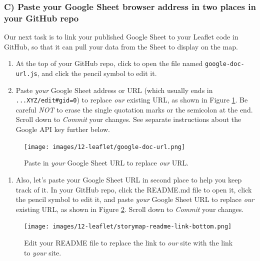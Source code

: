 \documentclass[
  english,
]{book}
\providecommand{\tightlist}{%
  \setlength{\itemsep}{0pt}\setlength{\parskip}{0pt}}
\begin{document}
\hypertarget{c-paste-your-google-sheet-browser-address-in-two-places-in-your-github-repo-1}{%
\subsubsection*{C) Paste your Google Sheet browser address in two places in your GitHub repo}\label{c-paste-your-google-sheet-browser-address-in-two-places-in-your-github-repo-1}}

Our next task is to link your published Google Sheet to your Leaflet code in GitHub, so that it can pull your data from the Sheet to display on the map.

\begin{enumerate}
\def\labelenumi{\arabic{enumi}.}
\item
  At the top of your GitHub repo, click to open the file named \texttt{google-doc-url.js}, and click the pencil symbol to edit it.
\item
  Paste \emph{your} Google Sheet address or URL (which usually ends in \texttt{...XYZ/edit\#gid=0}) to replace \emph{our} existing URL, as shown in Figure \ref{fig:google-doc-url2}. Be careful \emph{NOT} to erase the single quotation marks or the semicolon at the end. Scroll down to \emph{Commit} your changes. See separate instructions about the Google API key further below.
\end{enumerate}



\begin{figure}
\centering
\texttt{[image: images/12-leaflet/google-doc-url.png]}
\caption{\label{fig:google-doc-url2}Paste in \emph{your} Google Sheet URL to replace \emph{our} URL.}
\end{figure}

\begin{enumerate}
\def\labelenumi{\arabic{enumi}.}
\setcounter{enumi}{2}
\tightlist
\item
  Also, let's paste your Google Sheet URL in second place to help you keep track of it. In your GitHub repo, click the README.md file to open it, click the pencil symbol to edit it, and paste \emph{your} Google Sheet URL to replace \emph{our} existing URL, as shown in Figure \ref{fig:storymap-readme-link-bottom}. Scroll down to \emph{Commit} your changes.
\end{enumerate}



\begin{figure}
\centering
\texttt{[image: images/12-leaflet/storymap-readme-link-bottom.png]}
\caption{\label{fig:storymap-readme-link-bottom}Edit your README file to replace the link to \emph{our} site with the link to \emph{your} site.}
\end{figure}
\end{document}
